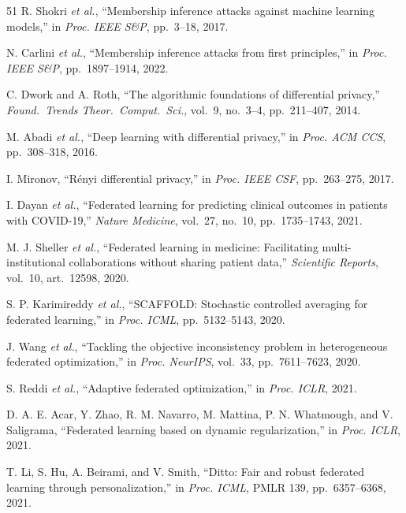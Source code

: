 \documentclass[conference,a4paper]{IEEEtran}
\begin{document}
\begin{thebibliography}{51}
R. Shokri \textit{et al.}, ``Membership inference attacks against machine learning models,'' in \textit{Proc. IEEE S\&P}, pp.~3--18, 2017.

N. Carlini \textit{et al.}, ``Membership inference attacks from first principles,'' in \textit{Proc. IEEE S\&P}, pp.~1897--1914, 2022.

C. Dwork and A. Roth, ``The algorithmic foundations of differential privacy,'' \textit{Found.~Trends Theor.~Comput.~Sci.}, vol.~9, no.~3--4, pp.~211--407, 2014.

M. Abadi \textit{et al.}, ``Deep learning with differential privacy,'' in \textit{Proc. ACM CCS}, pp.~308--318, 2016.

I. Mironov, ``R\'enyi differential privacy,'' in \textit{Proc. IEEE CSF}, pp.~263--275, 2017.

I. Dayan \textit{et al.}, ``Federated learning for predicting clinical outcomes in patients with COVID-19,'' \textit{Nature Medicine}, vol.~27, no.~10, pp.~1735--1743, 2021.

M. J. Sheller \textit{et al.}, ``Federated learning in medicine: Facilitating multi-institutional collaborations without sharing patient data,'' \textit{Scientific Reports}, vol.~10, art.~12598, 2020.

S. P. Karimireddy \textit{et al.}, ``SCAFFOLD: Stochastic controlled averaging for federated learning,'' in \textit{Proc. ICML}, pp.~5132--5143, 2020.

J. Wang \textit{et al.}, ``Tackling the objective inconsistency problem in heterogeneous federated optimization,'' in \textit{Proc. NeurIPS}, vol.~33, pp.~7611--7623, 2020.

S. Reddi \textit{et al.}, ``Adaptive federated optimization,'' in \textit{Proc. ICLR}, 2021.

D. A. E. Acar, Y. Zhao, R. M. Navarro, M. Mattina, P. N. Whatmough, and V. Saligrama, ``Federated learning based on dynamic regularization,'' in \textit{Proc. ICLR}, 2021.

T. Li, S. Hu, A. Beirami, and V. Smith, ``Ditto: Fair and robust federated learning through personalization,'' in \textit{Proc. ICML}, PMLR 139, pp.~6357--6368, 2021.


\end{thebibliography}
\end{document}
